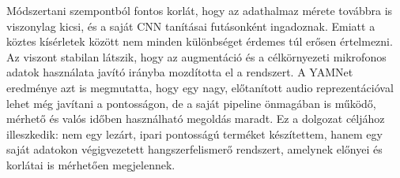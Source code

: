 Módszertani szempontból fontos korlát, hogy az adathalmaz mérete továbbra is viszonylag kicsi, és a saját CNN tanításai futásonként ingadoznak. Emiatt a köztes kísérletek között nem minden különbséget érdemes túl erősen értelmezni. Az viszont stabilan látszik, hogy az augmentáció és a célkörnyezeti mikrofonos adatok használata javító irányba mozdította el a rendszert. A YAMNet eredménye azt is megmutatta, hogy egy nagy, előtanított audio reprezentációval lehet még javítani a pontosságon, de a saját pipeline önmagában is működő, mérhető és valós időben használható megoldás maradt. Ez a dolgozat céljához illeszkedik: nem egy lezárt, ipari pontosságú terméket készítettem, hanem egy saját adatokon végigvezetett hangszerfelismerő rendszert, amelynek előnyei és korlátai is mérhetően megjelennek.
